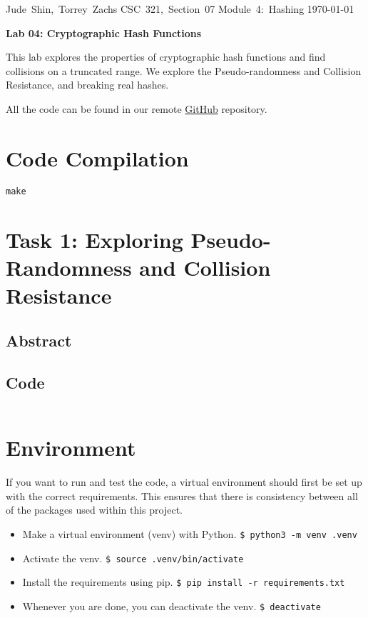 \documentclass[11pt]{article}
\begin{document}
\hfill\vbox{\hbox{Jude Shin, Torrey Zachs}
		\hbox{CSC 321, Section 07}	
		\hbox{Module 4: Hashing}	
		\hbox{\today}}\par

\bigskip
\centerline{\Large\bf Lab 04: Cryptographic Hash Functions}\par
\bigskip

This lab explores the properties of cryptographic hash functions and find collisions on a truncated range. We explore the Pseudo-randomness and Collision Resistance, and breaking real hashes.

All the code can be found in our remote \href{https://github.com/jude-shin/CSC\_321}{GitHub} repository.

\section*{Code Compilation}

\verb|make|

\section*{Task 1: Exploring Pseudo-Randomness and Collision Resistance}

\subsection*{Abstract}

\subsection*{Code}

\begin{lstlisting}
\end{lstlisting}

\section*{Environment}

If you want to run and test the code, a virtual environment should first be set up with the correct requirements. This ensures that there is consistency between all of the packages used within this project.

\begin{itemize}
	\item Make a virtual environment (venv) with Python.
		\verb|$ python3 -m venv .venv|
	\item Activate the venv.
		\verb|$ source .venv/bin/activate|
	\item Install the requirements using pip.
		\verb|$ pip install -r requirements.txt|
	\item Whenever you are done, you can deactivate the venv.
		\verb|$ deactivate|
\end{itemize}
\end{document}
